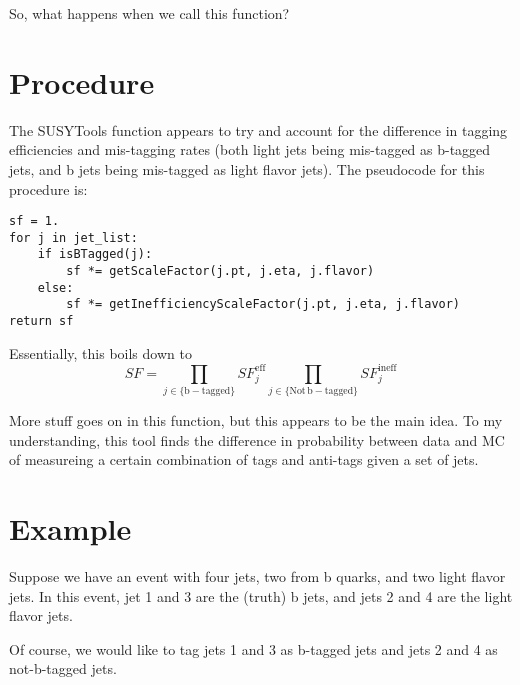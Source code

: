 \documentclass[12]{article}
\begin{document}
So, what happens when we call this function?

\section{Procedure}

The SUSYTools function appears to try and account for the difference in tagging efficiencies and mis-tagging rates (both light jets being mis-tagged as b-tagged jets, and b jets being mis-tagged as light flavor jets).
The pseudocode for this procedure is:

\begin{lstlisting}
sf = 1.
for j in jet_list:
    if isBTagged(j):
        sf *= getScaleFactor(j.pt, j.eta, j.flavor)
    else:
        sf *= getInefficiencyScaleFactor(j.pt, j.eta, j.flavor)
return sf
\end{lstlisting}

Essentially, this boils down to
\begin{equation}
  SF =
  \prod_{j \in \mathrm{\{b-tagged\}}} SF_j^{\mathrm{eff}}
  \prod_{j \in \mathrm{\{Not\, b-tagged\}}} SF_j^{\mathrm{ineff}}
\end{equation}

More stuff goes on in this function, but this appears to be the main idea.
To my understanding, this tool finds the difference in probability between data and MC of measureing a certain combination of tags and anti-tags given a set of jets.

\section{Example}
Suppose we have an event with four jets, two from b quarks, and two light flavor jets.
In this event, jet 1 and 3 are the (truth) b jets, and jets 2 and 4 are the light flavor jets.

\begin{center}
\end{center}

Of course, we would like to tag jets 1 and 3 as b-tagged jets and jets 2 and 4 as not-b-tagged jets.
\end{document}
